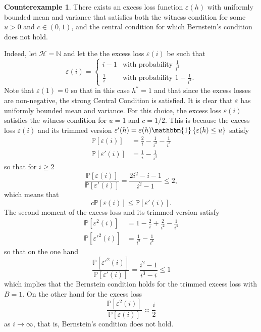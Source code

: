 \documentclass{uvamath}
\newcommand*{\nats}{\mathbb{N}}
\newcommand*{\calH}{\mathcal{H}}
\newcommand*{\bbP}{\mathbb{P}}
\newcommand*{\indicator}[1]{\mathbbm{1}\left\{#1\right\}}
\theoremstyle{remark}
\theoremstyle{definition}
\newtheorem{counterexample}[theorem]{Counterexample}
\theoremstyle{definition}
\theoremstyle{definition}
\theoremstyle{definition}
\theoremstyle{definition}
\begin{document}
\begin{counterexample}\label{ctrex:central_but_not_bernstein}
  There exists an excess loss function $\varepsilon(h)$ with uniformly
  bounded mean and variance that satisfies both the witness condition
  for some $u>0$ and $c\in(0,1)$, and the central condition for which
  Bernstein's condition does not hold.

  Indeed, let $\calH=\nats$ and let the the excess loss
  $\varepsilon(i)$ be such that
  \begin{equation*}
    \varepsilon(i) =
    \begin{cases}
      i-1 &\mbox{with probability } \frac{1}{i^2} \\
      \frac{1}{i} &\mbox{with probability } 1-\frac{1}{i^2}.
    \end{cases}
  \end{equation*}
  Note that $\varepsilon(1)=0$ so that in this case $h^* = 1$ and that
  since the excess losses are non-negative, the strong Central
  Condition is satisfied. It is clear that $\varepsilon$ has uniformly
  bounded mean and variance. For this choice, the excess loss
  $\varepsilon(i)$ satisfies the witness condition for $u=1$ and
  $c=1/2$. This is because the excess loss $\varepsilon(i)$ and its
  trimmed version
  $\varepsilon'(h) = \varepsilon(h)\indicator{\varepsilon(h)\leq u}$
  satisfy
  \begin{align}
    \bbP[\varepsilon(i)] &= \frac{2}{i} - \frac{1}{i^2} - \frac{1}{i^3}\\
    \bbP[\varepsilon'(i)] &=  \frac{1}{i} - \frac{1}{i^3}
  \end{align}
  so that for $i\geq 2$
  \begin{equation*}
    \frac{\bbP[\varepsilon(i)]}{\bbP[\varepsilon'(i)]} = \frac{2i^2 - i -
      1}{i^2 - 1} \leq 2,
  \end{equation*}
  which means that
  \begin{equation*}
    c\bbP[\varepsilon(i)] \leq \bbP[\varepsilon'(i)].
  \end{equation*}
  The second moment of the excess loss and its trimmed version satisfy
  \begin{align}
    \bbP[\varepsilon^2(i)] &= 1 -\frac{2}{i} + \frac{2}{i^2} - \frac{1}{i^4}\\
    \bbP[\varepsilon'^2(i)] &=  \frac{1}{i^2} - \frac{1}{i^4}
  \end{align}
  so that on the one hand
  \begin{equation*}
    \frac{\bbP[\varepsilon'^2(i)]}{\bbP[\varepsilon'(i)]} = \frac{i^2 -
      1}{i^3 - i}\leq 1
  \end{equation*}
  which implies that the Bernstein condition holds for the trimmed
  excess loss with $B =1$. On the other hand for the excess loss
  \begin{equation*}
    \frac{\bbP[\varepsilon^2(i)]}{\bbP[\varepsilon(i)]}\asymp \frac{i}{2}
  \end{equation*}
  as $i\to\infty$, that is, Bernstein's condition does not hold.
\end{counterexample}
\end{document}
